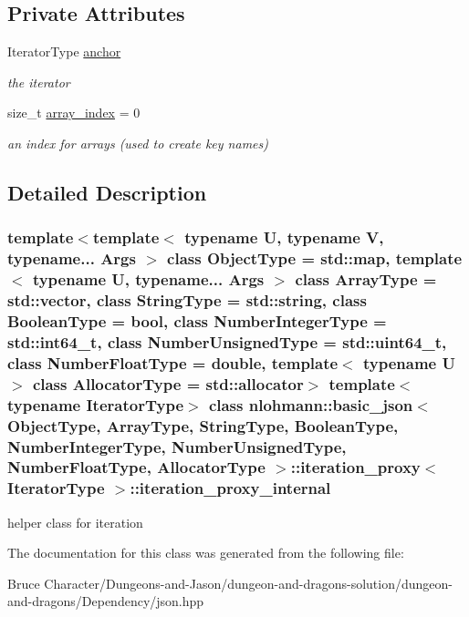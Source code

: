 \subsection*{Private Attributes}
\begin{DoxyCompactItemize}
\item 
\hypertarget{classnlohmann_1_1basic__json_1_1iteration__proxy_1_1iteration__proxy__internal_a7b2f75557da51e1e90de0085e8578217}{}\label{classnlohmann_1_1basic__json_1_1iteration__proxy_1_1iteration__proxy__internal_a7b2f75557da51e1e90de0085e8578217} 
Iterator\+Type \hyperlink{classnlohmann_1_1basic__json_1_1iteration__proxy_1_1iteration__proxy__internal_a7b2f75557da51e1e90de0085e8578217}{anchor}
\begin{DoxyCompactList}\small\item\em the iterator \end{DoxyCompactList}\item 
\hypertarget{classnlohmann_1_1basic__json_1_1iteration__proxy_1_1iteration__proxy__internal_a34fbf864472f7b7f8a7513fe08d87311}{}\label{classnlohmann_1_1basic__json_1_1iteration__proxy_1_1iteration__proxy__internal_a34fbf864472f7b7f8a7513fe08d87311} 
size\+\_\+t \hyperlink{classnlohmann_1_1basic__json_1_1iteration__proxy_1_1iteration__proxy__internal_a34fbf864472f7b7f8a7513fe08d87311}{array\+\_\+index} = 0
\begin{DoxyCompactList}\small\item\em an index for arrays (used to create key names) \end{DoxyCompactList}\end{DoxyCompactItemize}


\subsection{Detailed Description}
\subsubsection*{template$<$template$<$ typename U, typename V, typename... Args $>$ class Object\+Type = std\+::map, template$<$ typename U, typename... Args $>$ class Array\+Type = std\+::vector, class String\+Type = std\+::string, class Boolean\+Type = bool, class Number\+Integer\+Type = std\+::int64\+\_\+t, class Number\+Unsigned\+Type = std\+::uint64\+\_\+t, class Number\+Float\+Type = double, template$<$ typename U $>$ class Allocator\+Type = std\+::allocator$>$\newline
template$<$typename Iterator\+Type$>$\newline
class nlohmann\+::basic\+\_\+json$<$ Object\+Type, Array\+Type, String\+Type, Boolean\+Type, Number\+Integer\+Type, Number\+Unsigned\+Type, Number\+Float\+Type, Allocator\+Type $>$\+::iteration\+\_\+proxy$<$ Iterator\+Type $>$\+::iteration\+\_\+proxy\+\_\+internal}

helper class for iteration 

The documentation for this class was generated from the following file\+:\begin{DoxyCompactItemize}
\item 
Bruce Character/\+Dungeons-\/and-\/\+Jason/dungeon-\/and-\/dragons-\/solution/dungeon-\/and-\/dragons/\+Dependency/json.\+hpp\end{DoxyCompactItemize}
